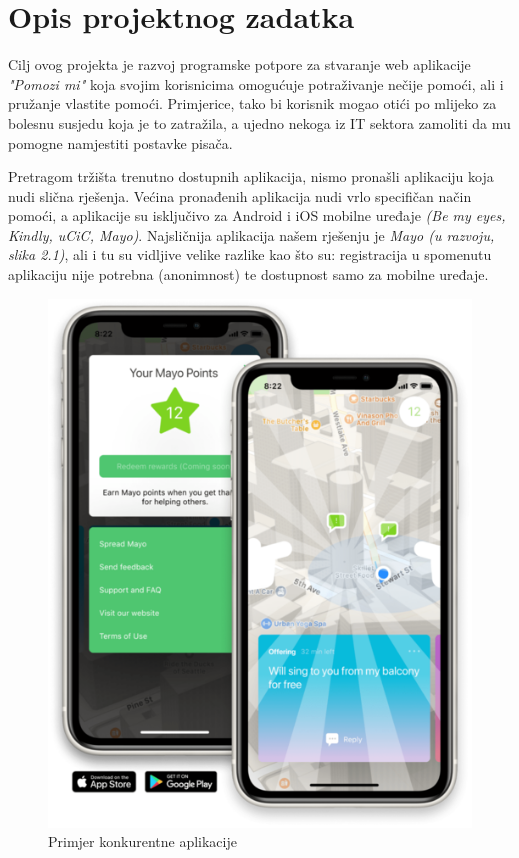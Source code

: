 \chapter{Opis projektnog zadatka}


Cilj ovog projekta je razvoj programske potpore za stvaranje web aplikacije \textit{"Pomozi mi"} koja svojim korisnicima omogućuje potraživanje nečije pomoći, ali i pružanje vlastite pomoći. 
Primjerice, tako bi korisnik mogao otići po mlijeko za bolesnu susjedu koja je to zatražila, a ujedno nekoga iz IT sektora zamoliti da mu pomogne namjestiti postavke pisača. 

Pretragom tržišta trenutno dostupnih aplikacija, nismo pronašli aplikaciju koja nudi slična rješenja. Većina pronađenih aplikacija nudi vrlo specifičan način pomoći, a aplikacije su isključivo za Android i iOS mobilne uređaje \textit{(Be my eyes, Kindly, uCiC, Mayo)}. Najsličnija aplikacija našem rješenju je \textit{Mayo (u razvoju, slika 2.1)}, ali i tu su vidljive velike razlike kao što su: registracija u spomenutu aplikaciju nije potrebna (anonimnost) te dostupnost samo za mobilne uređaje.\\


\begin{figure}[H]
	\includegraphics[scale=0.2]{slike/mayo-hero.PNG} %
	\centering
	\caption{Primjer konkurentne aplikacije}
\end{figure}

